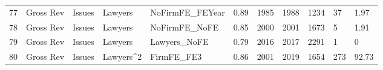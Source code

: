 \begin{table}[ht]
\begin{tabular}{rllllllllll}
  77 & Gross Rev & Issues & Lawyers & NoFirmFE\_FEYear & 0.89 & 1985 & 1988 & 1234 & 37 & 1.97 \\ 
  78 & Gross Rev & Issues & Lawyers & NoFirmFE\_NoFE & 0.85 & 2000 & 2001 & 1673 & 5 & 1.91 \\ 
  79 & Gross Rev & Issues & Lawyers & Lawyers\_NoFE & 0.79 & 2016 & 2017 & 2291 & 1 & 0 \\ 
  80 & Gross Rev & Issues & Lawyers^2 & FirmFE\_FE3 & 0.86 & 2001 & 2019 & 1654 & 273 & 92.73 \\ 
   \hline
\end{tabular}
\end{table}
